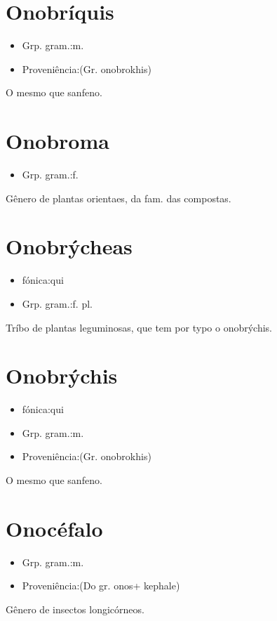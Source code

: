 \section{Onobríquis}
\begin{itemize}
\item {Grp. gram.:m.}
\end{itemize}
\begin{itemize}
\item {Proveniência:(Gr. \textunderscore onobrokhis\textunderscore )}
\end{itemize}
O mesmo que \textunderscore sanfeno\textunderscore .
\section{Onobroma}
\begin{itemize}
\item {Grp. gram.:f.}
\end{itemize}
Gênero de plantas orientaes, da fam. das compostas.
\section{Onobrýcheas}
\begin{itemize}
\item {fónica:qui}
\end{itemize}
\begin{itemize}
\item {Grp. gram.:f. pl.}
\end{itemize}
Tríbo de plantas leguminosas, que tem por typo o onobrýchis.
\section{Onobrýchis}
\begin{itemize}
\item {fónica:qui}
\end{itemize}
\begin{itemize}
\item {Grp. gram.:m.}
\end{itemize}
\begin{itemize}
\item {Proveniência:(Gr. \textunderscore onobrokhis\textunderscore )}
\end{itemize}
O mesmo que \textunderscore sanfeno\textunderscore .
\section{Onocéfalo}
\begin{itemize}
\item {Grp. gram.:m.}
\end{itemize}
\begin{itemize}
\item {Proveniência:(Do gr. \textunderscore onos\textunderscore  + \textunderscore kephale\textunderscore )}
\end{itemize}
Gênero de insectos longicórneos.
